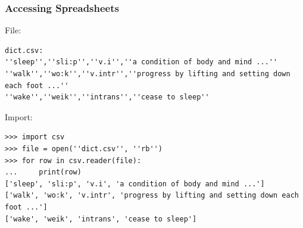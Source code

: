 \begin{frame}[fragile]\frametitle{Accessing Spreadsheets}
File:
\begin{lstlisting}
dict.csv:
''sleep'',''sli:p'',''v.i'',''a condition of body and mind ...''
''walk'',''wo:k'',''v.intr'',''progress by lifting and setting down each foot ...''
''wake'',''weik'',''intrans'',''cease to sleep''

\end{lstlisting}

Import:

\begin{lstlisting}
>>> import csv
>>> file = open(''dict.csv'', ''rb'')
>>> for row in csv.reader(file):
...     print(row)
['sleep', 'sli:p', 'v.i', 'a condition of body and mind ...']
['walk', 'wo:k', 'v.intr', 'progress by lifting and setting down each foot ...']
['wake', 'weik', 'intrans', 'cease to sleep']
\end{lstlisting}
\end{frame}
%
%        



